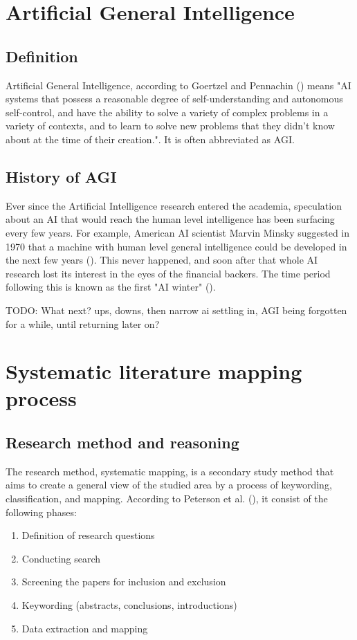 \documentclass[utf8,english]{gradu3}
\begin{document}
\chapter{Artificial General Intelligence} 



\section{Definition}
Artificial General Intelligence, according to Goertzel and Pennachin (\cite*{goertzel2007}) means "AI systems that possess a reasonable degree of self-understanding and autonomous self-control, and have the ability to solve a variety of complex problems in a variety of contexts, and to learn to solve new problems that they didn't know about at the time of their creation.". It is often abbreviated as AGI.

\section{History of AGI}
Ever since the Artificial Intelligence research entered the academia, speculation about an AI that would reach the human level intelligence has been surfacing every few years. For example, American AI scientist Marvin Minsky suggested in 1970 that a machine with human level general intelligence could be developed in the next few years (\cite{kaplan2019}). This never happened, and soon after that whole AI research lost its interest in the eyes of the financial backers. The time period following this is known as the first "AI winter" (\cite{kaplan2019}).

TODO: What next? ups, downs, then narrow ai settling in, AGI being forgotten for a while, until returning later on?


\chapter{Systematic literature mapping process}

\section{Research method and reasoning}

\label{method}
The research method, systematic mapping, is a secondary study method that aims to create a general view of the studied area by a process of keywording, classification, and mapping. According to Peterson et al. (\cite*{petersen2008}), it consist of the following phases:
\begin{enumerate}
    \item Definition of research questions
    \item Conducting search
    \item Screening the papers for inclusion and exclusion
    \item Keywording (abstracts, conclusions, introductions)
    \item Data extraction and mapping
\end{enumerate}
\end{document}
